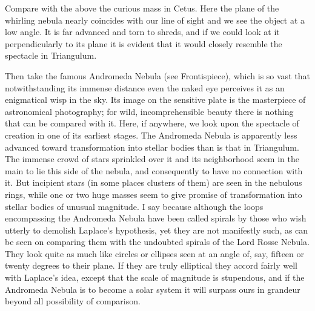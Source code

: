 
Compare with the above the curious mass in Cetus. Here the plane of 
the whirling nebula nearly coincides with our line of sight and we see
the object at a low angle. It is far advanced and torn to shreds, and
if we could look at it perpendicularly to its plane it is evident that
it would closely resemble the spectacle in Triangulum. 


Then take the famous Andromeda Nebula (see Frontispiece), which is so
vast that notwithstanding its immense distance even the naked eye
perceives it as an enigmatical wisp in the sky. Its image on the
sensitive plate is the masterpiece of astronomical photography; for
wild, incomprehensible beauty there is nothing that can be compared
with it. Here, if anywhere, we look upon the spectacle of creation in
one of its earliest stages. The Andromeda Nebula is apparently less
advanced toward transformation into stellar bodies than is that in
Triangulum. The immense crowd of stars sprinkled over it and its
neighborhood seem in the main to lie this side of the nebula, and
consequently to have no connection with it. But incipient stars (in
some places clusters of them) are seen in the nebulous rings, while
one or two huge masses seem to give promise of transformation into
stellar bodies of unusual magnitude. I say  because
although the loops encompassing the Andromeda Nebula have been called
spirals by those who wish utterly to demolish Laplace's hypothesis, 
yet they are not manifestly such, as can be seen on comparing them
with the undoubted spirals of the Lord Rosse Nebula. They look quite
as much like circles or ellipses seen at an angle of, say, fifteen or
twenty degrees to their plane. If they are truly elliptical they
accord fairly well with Laplace's idea, except that the scale of
magnitude is stupendous, and if the Andromeda Nebula is to become a
solar system it will surpass ours in grandeur beyond all possibility
of comparison.

